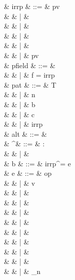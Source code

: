 \documentclass[a4paper]{article}
\begin{document}
{
\small
\begin{grammar}
   & irrp & ::= & pv \\
                        &      & |   &  \\
                        &      & |   &  \\
                        &      & |   & \sWILDCARD \\
                        &      & |   & \sunit \\
                        &      & |   & pv\  \\
   & pfield & ::= & \sALLFIELDS \\
                       &        & |   & f = irrp \\
   & pat & ::= & T\  \\
                 &     & |   & n\\
                 &     & |   & b\\
                 &     & |   & c\\
                 &     & |   & irrp\\
   & alt & ::= & \\
   & \cdot^\tau & ::= & \cdot : \tau \\
                         &          & |   & \cdot \\
   & b & ::= & irrp^\tau = e\ \sBANG {} \\
   & e & ::= & op\  \\
                    &   & |   & v \\
                    &   & |   &  \\
                    &   & |   &  \\
                    &   & |   &  \\
                    &   & |   &  \\
                    &   & |   &  \\
                    &   & |   &  \\
                    &   & |   &  \\
                    &   & |   & \sunit \\
                    &   & |   & \ell_n \\

\end{grammar}}
\end{document}
